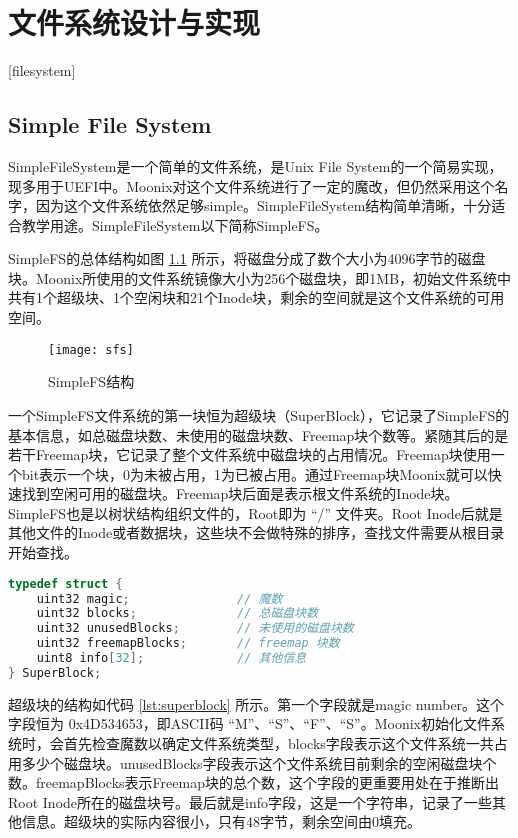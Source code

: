 
\chapter{文件系统设计与实现}[filesystem]
\label{chapter:filesystem}

\section{Simple File System}

SimpleFileSystem是一个简单的文件系统，是Unix File System\cite{ufs}的一个简易实现，现多用于UEFI中。Moonix对这个文件系统进行了一定的魔改，但仍然采用这个名字，因为这个文件系统依然足够simple。SimpleFileSystem结构简单清晰，十分适合教学用途。SimpleFileSystem以下简称SimpleFS。

SimpleFS的总体结构如图 \ref{pic:sfs} 所示，将磁盘分成了数个大小为4096字节的磁盘块。Moonix所使用的文件系统镜像大小为256个磁盘块，即1MB，初始文件系统中共有1个超级块、1个空闲块和21个Inode块，剩余的空间就是这个文件系统的可用空间。

\begin{figure}[htpb]
	\centering
	\texttt{[image: sfs]}
	\setlength{\abovecaptionskip}{2pt}
	\caption{SimpleFS结构}
	\label{pic:sfs}
\end{figure}

一个SimpleFS文件系统的第一块恒为超级块（SuperBlock），它记录了SimpleFS的基本信息，如总磁盘块数、未使用的磁盘块数、Freemap块个数等。紧随其后的是若干Freemap块，它记录了整个文件系统中磁盘块的占用情况。Freemap块使用一个bit表示一个块，0为未被占用，1为已被占用。通过Freemap块Moonix就可以快速找到空闲可用的磁盘块。Freemap块后面是表示根文件系统的Inode块。SimpleFS也是以树状结构组织文件的，Root即为 “/” 文件夹。Root Inode后就是其他文件的Inode或者数据块，这些块不会做特殊的排序，查找文件需要从根目录开始查找。

\begin{lstlisting}[language={C}, caption={SimpleFS超级块结构}, label={lst:superblock}]
typedef struct {
	uint32 magic;               // 魔数
	uint32 blocks;              // 总磁盘块数
	uint32 unusedBlocks;        // 未使用的磁盘块数
	uint32 freemapBlocks;       // freemap 块数
	uint8 info[32];             // 其他信息
} SuperBlock;
\end{lstlisting}

超级块的结构如代码 \ref{lst:superblock} 所示。第一个字段就是magic number。这个字段恒为 0x4D534653，即ASCII码 “M”、“S”、“F”、“S”。Moonix初始化文件系统时，会首先检查魔数以确定文件系统类型，blocks字段表示这个文件系统一共占用多少个磁盘块。unusedBlocks字段表示这个文件系统目前剩余的空闲磁盘块个数。freemapBlocks表示Freemap块的总个数，这个字段的更重要用处在于推断出Root Inode所在的磁盘块号。最后就是info字段，这是一个字符串，记录了一些其他信息。超级块的实际内容很小，只有48字节，剩余空间由0填充。

